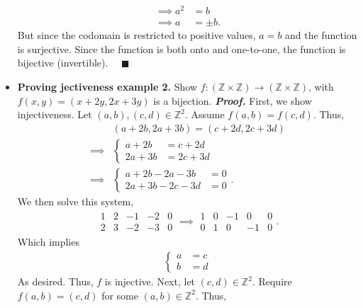 \documentclass{report}
\begin{document}
\begin{itemize}
\begin{align*}
                \implies a^{2} &= b \\
                \implies a &= \pm b
            .\end{align*}
            But since the codomain is restricted to positive values, $a=b$ and the function is surjective. Since the function is both onto and one-to-one, the function is bijective (invertible). $\quad \blacksquare $
        \item \textbf{Proving jectiveness example 2.} Show $f: (\mathbb{Z} \times \mathbb{Z}) \to (\mathbb{Z} \times \mathbb{Z})$, with $f(x,y) = (x+2y, 2x+3y) $ is a bijection.
            \bigbreak \noindent 
            \textbf{\textit{Proof.}} First, we show injectiveness. Let $(a,b), (c,d) \in \mathbb{Z}^{2}$. Assume $f(a,b) = f(c,d) $. Thus,
            \begin{align*}
                &(a+2b,2a+3b) = (c+2d, 2c+3d) \\
                \implies &\begin{cases} a+2b &=c+2d \\ 2a+3b &=2c+3d \end{cases} \\
                \implies &\begin{cases} a+2b-2a-3b &=0 \\ 2a+3b-2c-3d &=0 \end{cases} 
            .\end{align*}
            We then solve this system,
            \begin{align*}
                \begin{array}{cccc|c} 1 & 2 & -1 & -2 & 0\\ 2 & 3 & -2 & -3 & 0 \end{array} \implies \begin{array}{cccc|c} 1 & 0 & -1 & 0 & 0 \\ 0 &1 & 0 & -1 & 0\end{array}
            .\end{align*}
            Which implies 
            \begin{align*}
                \begin{cases}
                    a &= c \\
                    b &=d
                \end{cases}
           \end{align*}
            As desired. Thus, $f$ is injective. Next, let $(c,d) \in \mathbb{Z}^{2}$. Require $f(a,b) = (c,d)$ for some $(a,b) \in \mathbb{Z}^{2} $. Thus,
            \begin{align*}

\end{align*}
\end{itemize}
\end{document}
